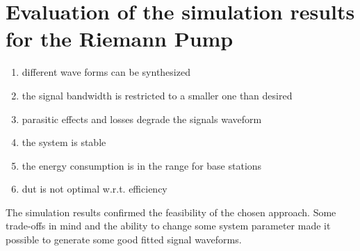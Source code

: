 
 


\section{Evaluation of the simulation results for the Riemann Pump}

\begin{enumerate}
	\item different wave forms can be synthesized
	\item the signal bandwidth is restricted to a smaller one than desired
	\item parasitic effects and losses degrade the signals waveform
	\item the system is stable
	\item the energy consumption is in the range for base stations
	\item dut is not optimal w.r.t. efficiency
\end{enumerate}






The simulation results confirmed the feasibility of the chosen approach.
Some trade-offs in mind and the ability to change some system parameter made it possible to generate some good fitted signal waveforms.

